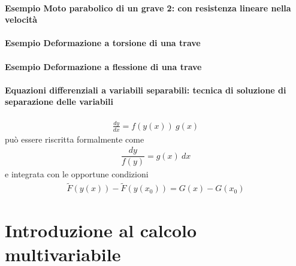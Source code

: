 \documentclass[letterpaper,10pt,italian]{jupyterBook}
\begin{document}
\subsubsection*{Esempio \sphinxhyphen{} Moto parabolico di un grave \sphinxhyphen{} 2: con resistenza lineare nella velocità}
\subsubsection*{Esempio \sphinxhyphen{} Deformazione a torsione di una trave}
\subsubsection*{Esempio \sphinxhyphen{} Deformazione a flessione di una trave}


\subsubsection{Equazioni differenziali a variabili separabili: tecnica di soluzione di separazione delle variabili}
\label{\detokenize{ch/ode:equazioni-differenziali-a-variabili-separabili-tecnica-di-soluzione-di-separazione-delle-variabili}}\label{\detokenize{ch/ode:ode-hs-types-separable}}\begin{equation*}
\begin{split}\frac{d y}{d x} = f(y(x)) \ g(x) \end{split}
\end{equation*}
\sphinxAtStartPar
può essere riscritta formalmente come
\begin{equation*}
\begin{split}\dfrac{dy}{f(y)} = g(x) \ d x \end{split}
\end{equation*}
\sphinxAtStartPar
e integrata con le opportune condizioni
\begin{equation*}
\begin{split}\tilde{F}(y(x)) - \tilde{F}(y(x_0)) = G(x) - G(x_0)\end{split}
\end{equation*}




\sphinxstepscope


\chapter{Introduzione al calcolo multi\sphinxhyphen{}variabile}
\label{\detokenize{ch/multivariable-calculus:introduzione-al-calcolo-multi-variabile}}\label{\detokenize{ch/multivariable-calculus:multivariable-calculus}}\label{\detokenize{ch/multivariable-calculus::doc}}
\sphinxstepscope
\end{document}
